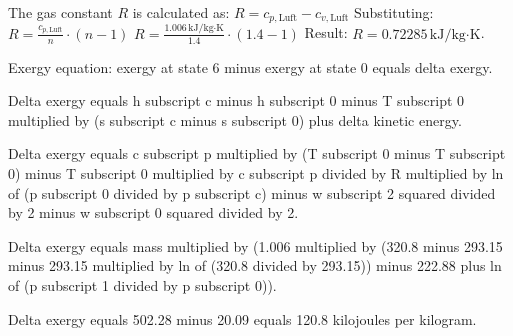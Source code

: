 The gas constant \( R \) is calculated as:  
\( R = c_{p,\text{Luft}} - c_{v,\text{Luft}} \)  
Substituting:  
\( R = \frac{c_{p,\text{Luft}}}{n} \cdot (n - 1) \)  
\( R = \frac{1.006 \, \text{kJ/kg·K}}{1.4} \cdot (1.4 - 1) \)  
Result: \( R = 0.72285 \, \text{kJ/kg·K} \).

Exergy equation:  
exergy at state 6 minus exergy at state 0 equals delta exergy.  

Delta exergy equals h subscript c minus h subscript 0 minus T subscript 0 multiplied by (s subscript c minus s subscript 0) plus delta kinetic energy.  

Delta exergy equals c subscript p multiplied by (T subscript 0 minus T subscript 0) minus T subscript 0 multiplied by c subscript p divided by R multiplied by ln of (p subscript 0 divided by p subscript c) minus w subscript 2 squared divided by 2 minus w subscript 0 squared divided by 2.  

Delta exergy equals mass multiplied by (1.006 multiplied by (320.8 minus 293.15 minus 293.15 multiplied by ln of (320.8 divided by 293.15)) minus 222.88 plus ln of (p subscript 1 divided by p subscript 0)).  

Delta exergy equals 502.28 minus 20.09 equals 120.8 kilojoules per kilogram.